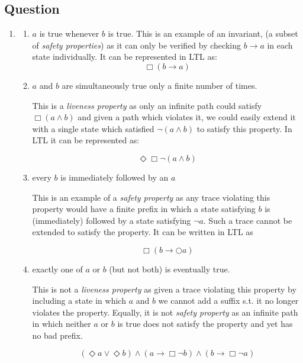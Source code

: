 \documentclass[12pt,a4paper]{article}
\newcounter{question}\setcounter{question}{1}
\newenvironment{question}{%
\subsection*{Question \arabic{question}}}%
{\stepcounter{question}}
\begin{document}
\begin{question}
  \begin{enumerate}[label= (\alph*)]
    \item
          \begin{enumerate}[label= (\roman*)]
            \item
                  $a$ is true whenever $b$ is true. This is an example of an invariant, (a subset of \textit{safety properties}) as it can only be verified by checking $b \rightarrow a$ in each state individually. It can be represented in LTL as:
                  \[
                  \Box (b \rightarrow a)
                  \]

            \item
                  $a$ and $b$ are simultaneously true only a finite number of times.

                  This is a \textit{liveness property} as only an infinite path could satisfy $\Box(a \wedge b)$ and given a path which violates it, we could easily extend it with a single state which satisfied $\neg (a \wedge b)$ to satisfy this property. In LTL it can be represented as:


                  \[
                  \Diamond \Box \neg (a \wedge b)
                  \]

            \item
                  every $b$ is immediately followed by an $a$

                  This is an example of a \textit{safety property} as any trace violating this property would have a finite prefix in which a state satisfying $b$ is (immediately) followed by a state satisfying $\neg a$. Such a trace cannot be extended to satisfy the property. It can be written in LTL as


                  \[
                  \Box ( b \rightarrow \bigcirc a )
                  \]

            \item
                  exactly one of $a$ or $b$ (but not both) is eventually true.

                  This is not a \textit{liveness property} as given a trace violating this property by including a state in which $a$ and $b$ we cannot add a suffix s.t. it no longer violates the property. Equally, it is not \textit{safety property} as an infinite path in which neither $a$ or $b$ is true does not satisfy the property and yet has no bad prefix.

                  \[
                  (\Diamond a \vee \Diamond b) \wedge (a \rightarrow \Box \neg b) \wedge (b \rightarrow \Box \neg a)
                  \]


\end{enumerate}
\end{enumerate}
\end{question}
\end{document}
